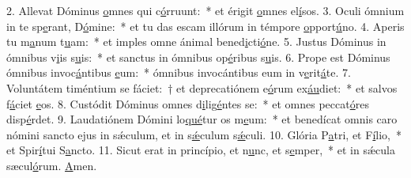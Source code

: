 2. Allevat Dóminus \uline{o}mnes qui c\uline{ó}rruunt:~* et érigit \uline{o}mnes el\uline{í}sos.
3. Oculi ómnium in te sp\uline{e}rant, D\uline{ó}mine:~* et tu das escam illórum in témpore \uline{o}pport\uline{ú}no.
4. Aperis tu m\uline{a}num t\uline{u}am:~* et imples omne ánimal bened\uline{i}cti\uline{ó}ne.
5. Justus Dóminus in ómnibus v\uline{i}is s\uline{u}is:~* et sanctus in ómnibus op\uline{é}ribus s\uline{u}is.
6. Prope est Dóminus ómnibus invoc\uline{á}ntibus \uline{e}um:~* ómnibus invocántibus eum in v\uline{e}rit\uline{á}te.
7. Voluntátem timéntium se fáciet:~† et deprecatiónem e\uline{ó}rum ex\uline{áu}diet:~* et salvos f\uline{á}ciet \uline{e}os.
8. Custódit Dóminus omnes d\uline{i}lig\uline{é}ntes se:~* et omnes peccat\uline{ó}res disp\uline{é}rdet.
9. Laudatiónem Dómini lo\uline{qué}tur os m\uline{e}um:~* et benedícat omnis caro nómini sancto ejus in sǽculum, et in s\uline{ǽ}culum s\uline{ǽ}culi.
10. Glória P\uline{a}tri, et F\uline{í}lio,~* et Spir\uline{í}tui S\uline{a}ncto.
11. Sicut erat in princípio, et n\uline{u}nc, et s\uline{e}mper,~* et in sǽcula sæcul\uline{ó}rum. \uline{A}men.
